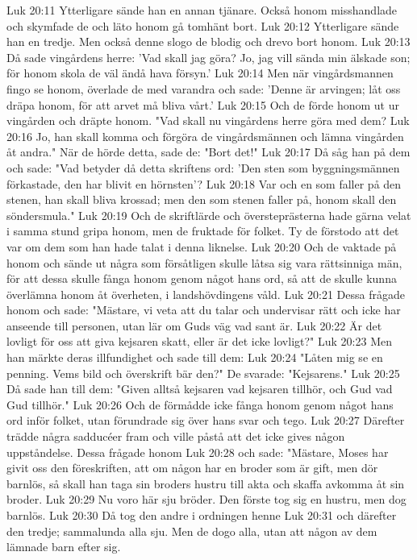 Luk 20:11  Ytterligare sände han en annan tjänare. Också honom misshandlade och skymfade de och läto honom gå tomhänt bort.
Luk 20:12  Ytterligare sände han en tredje. Men också denne slogo de blodig och drevo bort honom.
Luk 20:13  Då sade vingårdens herre: 'Vad skall jag göra? Jo, jag vill sända min älskade son; för honom skola de väl ändå hava försyn.'
Luk 20:14  Men när vingårdsmannen fingo se honom, överlade de med varandra och sade: 'Denne är arvingen; låt oss dräpa honom, för att arvet må bliva vårt.'
Luk 20:15  Och de förde honom ut ur vingården och dräpte honom. "Vad skall nu vingårdens herre göra med dem?
Luk 20:16  Jo, han skall komma och förgöra de vingårdsmännen och lämna vingården åt andra." När de hörde detta, sade de: "Bort det!"
Luk 20:17  Då såg han på dem och sade: "Vad betyder då detta skriftens ord: 'Den sten som byggningsmännen förkastade, den har blivit en hörnsten'?
Luk 20:18  Var och en som faller på den stenen, han skall bliva krossad; men den som stenen faller på, honom skall den söndersmula."
Luk 20:19  Och de skriftlärde och översteprästerna hade gärna velat i samma stund gripa honom, men de fruktade för folket. Ty de förstodo att det var om dem som han hade talat i denna liknelse.
Luk 20:20  Och de vaktade på honom och sände ut några som försåtligen skulle låtsa sig vara rättsinniga män, för att dessa skulle fånga honom genom något hans ord, så att de skulle kunna överlämna honom åt överheten, i landshövdingens våld.
Luk 20:21  Dessa frågade honom och sade: "Mästare, vi veta att du talar och undervisar rätt och icke har anseende till personen, utan lär om Guds väg vad sant är.
Luk 20:22  Är det lovligt för oss att giva kejsaren skatt, eller är det icke lovligt?"
Luk 20:23  Men han märkte deras illfundighet och sade till dem:
Luk 20:24  "Låten mig se en penning. Vems bild och överskrift bär den?" De svarade: "Kejsarens."
Luk 20:25  Då sade han till dem: "Given alltså kejsaren vad kejsaren tillhör, och Gud vad Gud tillhör."
Luk 20:26  Och de förmådde icke fånga honom genom något hans ord inför folket, utan förundrade sig över hans svar och tego.
Luk 20:27  Därefter trädde några sadducéer fram och ville påstå att det icke gives någon uppståndelse. Dessa frågade honom
Luk 20:28  och sade: "Mästare, Moses har givit oss den föreskriften, att om någon har en broder som är gift, men dör barnlös, så skall han taga sin broders hustru till akta och skaffa avkomma åt sin broder.
Luk 20:29  Nu voro här sju bröder. Den förste tog sig en hustru, men dog barnlös.
Luk 20:30  Då tog den andre i ordningen henne
Luk 20:31  och därefter den tredje; sammalunda alla sju. Men de dogo alla, utan att någon av dem lämnade barn efter sig.
